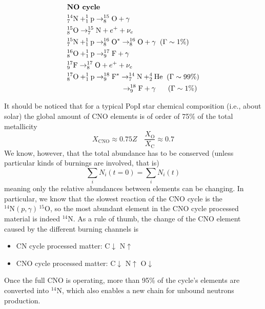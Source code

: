 \begin{align*}
    & \text{\textbf{NO cycle}}\\
    & \element{N}{14}{7}+\element{p}{1}{1}\to \element{O}{15}{8}+\gamma\\
    & \element{O}{15}{8}\to \element{N}{15}{7}+e^{+}+\nu_{e}\\
    & \element{N}{15}{7}+\element{p}{1}{1}\to \element{O}{16}{8}^{*}\to \element{O}{16}{8}+\gamma \;\; (\Gamma \sim 1\%)\\
    & \element{O}{16}{8}+\element{p}{1}{1}\to \element{F}{17}{9}+\gamma\\
    & \element{F}{17}{9}\to \element{O}{17}{8}+e^{+}+\nu_{e}\\
    & \element{O}{17}{8}+\element{p}{1}{1}\to \element{F}{18}{9}^{*}\to \element{N}{14}{7}+\element{He}{4}{2} \;\; (\Gamma \sim 99\%)\\
    &\quad\quad\quad\quad\quad\quad\quad\;\;\to \element{F}{18}{9}+\gamma \quad \;\;\,(\Gamma \sim 1\%)
\end{align*}
\par It should be noticed that for a typical PopI star chemical composition (i.e., about solar) the global amount of CNO elements is of order of 75\% of the total metallicity
\begin{equation*}
    X_{\text{CNO}}\approx 0.75Z \quad \frac{X_{\text{O}}}{X_{\text{C}}} \approx 0.7
\end{equation*}
We know, however, that the total abundance has to be conserved (unless particular kinds of burnings are involved, that is)
\begin{equation*}
    \sum_{i}N_{i}(t=0) = \sum_{i}N_{i}(t)
\end{equation*}
meaning only the relative abundances between elements can be changing. In particular, we know that the slowest reaction of the CNO cycle is the $^{14}\text{N}(p,\gamma)\,^{15}\text{O}$, so the most abundant element in the CNO cycle processed material is indeed $^{14}\text{N}$. As a rule of thumb, the change of the CNO element caused by the different burning channels is
\begin{itemize}
    \item CN cycle processed matter: C$\downarrow$ N$\uparrow$
    \item CNO cycle processed matter: C$\downarrow$ N$\uparrow$ O$\downarrow$
\end{itemize}
Once the full CNO is operating, more than 95\% of the cycle's elements are converted into $^{14}\text{N}$, which also enables a new chain for unbound neutrons production.
